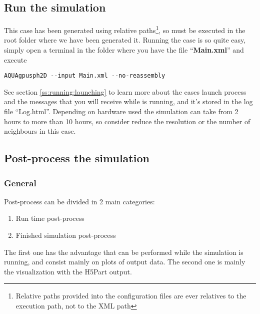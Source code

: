 \subsection{Run the simulation}
\label{ss:example:lateral_water_1x_deleffe:running}
%
This case has been generated using relative paths\footnote{Relative paths provided into the configuration
files are ever relatives to the execution path, not to the XML path}, so must be executed in the root folder
where we have been generated it. Running the case is so quite easy, simply open a terminal in the folder where
you have the file ``\textbf{Main.xml}'' and execute
%
\begin{verbatim}
AQUAgpusph2D --input Main.xml --no-reassembly
\end{verbatim}
%
See section \ref{ss:running:launching} to learn more about the cases launch process and the messages that you
will receive while \NAME is running, and it's stored in the log file ``Log.html''. Depending on hardware used
the simulation can take from 2 hours to more than 10 hours, so consider reduce the resolution or the number of
neighbours in this case.
%
\subsection{Post-process the simulation}
\label{ss:example:lateral_water_1x_deleffe:postprocess}
%
\subsubsection{General}
\label{sss:example:lateral_water_1x_deleffe:postprocess:general}
%
Post-process can be divided in 2 main categories:
%
\begin{enumerate}
	\item Run time post-process
	\item Finished simulation post-process
\end{enumerate}
%
The first one has the advantage that can be performed while the simulation is running, and consist mainly on
plots of output data. The second one is mainly the visualization with the H5Part output.
%
